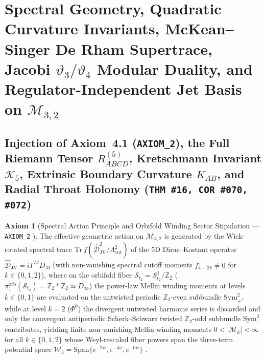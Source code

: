 \documentclass[11pt,a4paper]{article}
\newcommand{\catA}{\text{\textbf{\textcolor{purple!80!black}{[A]}}}}
\newcommand{\catD}{\text{\textbf{\textcolor{blue!75!black}{[D]}}}}
\theoremstyle{definition}
\newtheorem{axiom}{Axiom}[section]
\theoremstyle{plain}
\theoremstyle{remark}
\begin{document}
\section{\texorpdfstring{Spectral Geometry, Quadratic Curvature Invariants, McKean--Singer De Rham Supertrace, Jacobi $\vartheta_3/\vartheta_4$ Modular Duality, and Regulator-Independent Jet Basis on $\mathcal{M}_{3,2}$ \catD}{Spectral Geometry, Quadratic Curvature Invariants, McKean-Singer De Rham Supertrace, Jacobi Theta Modular Duality, and Regulator-Independent Jet Basis on M\_\{3,2\}}}
\label{sec:c4_spectral_geometry}

\subsection{Injection of Axiom~4.1 (\texttt{AXIOM\_2}), the Full Riemann Tensor $R^{(5)}_{ABCD}$, Kretschmann Invariant $\mathcal{K}_5$, Extrinsic Boundary Curvature $K_{AB}$, and Radial Throat Holonomy (\texttt{THM~\#16, COR~\#070, \#072})}

\begin{axiom}[{Spectral Action Principle and Orbifold Winding Sector Stipulation --- \texttt{AXIOM\_2} \catA}]\label{ax:axiom_two}
The effective geometric action on $\mathcal{M}_{3,2}$ is generated by the Wick-rotated spectral trace $\mathrm{Tr}\,f(\widehat{\mathcal{D}}_{\mathrm{JV}}^2/\Lambda_{\mathrm{cut}}^2)$ of the 5D Dirac--Kostant operator $\widehat{\mathcal{D}}_{\mathrm{JV}} = i\Gamma^M D_M$ (with non-vanishing spectral cutoff moments $f_{4-2k} \neq 0$ for $k \in \{0, 1, 2\}$), where on the orbifold fiber $\mathcal{S}_{t_2} = S^1_{t_2}/\mathbb{Z}_2$ ($\pi_1^{\mathrm{orb}}(\mathcal{S}_{t_2}) = \mathbb{Z}_2 * \mathbb{Z}_2 \simeq D_\infty$) the power-law Mellin winding moments at levels $k \in \{0, 1\}$ are evaluated on the untwisted periodic $\mathbb{Z}_2$-even subbundle $\mathrm{Sym}^2_+$, while at level $k = 2$ ($\Phi^0$) the divergent untwisted harmonic series is discarded and only the convergent antiperiodic Scherk--Schwarz twisted $\mathbb{Z}_2$-odd subbundle $\mathrm{Sym}^2_-$ contributes, yielding finite non-vanishing Mellin winding moments $0 < |\mathcal{M}_k| < \infty$ for all $k \in \{0, 1, 2\}$ whose Weyl-rescaled fiber powers span the three-term potential space $\mathcal{W}_3 = \mathrm{Span}\{e^{-2\psi}, e^{-4\psi}, e^{-6\psi}\}$ \catA.
\end{axiom}
\end{document}
